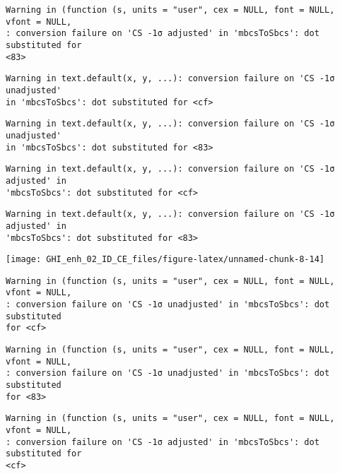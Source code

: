 \documentclass[
  10pt,
  a4paper,oneside]{article}
\begin{document}
\begin{verbatim}
Warning in (function (s, units = "user", cex = NULL, font = NULL, vfont = NULL,
: conversion failure on 'CS -1σ adjusted' in 'mbcsToSbcs': dot substituted for
<83>
\end{verbatim}

\begin{verbatim}
Warning in text.default(x, y, ...): conversion failure on 'CS -1σ unadjusted'
in 'mbcsToSbcs': dot substituted for <cf>
\end{verbatim}

\begin{verbatim}
Warning in text.default(x, y, ...): conversion failure on 'CS -1σ unadjusted'
in 'mbcsToSbcs': dot substituted for <83>
\end{verbatim}

\begin{verbatim}
Warning in text.default(x, y, ...): conversion failure on 'CS -1σ adjusted' in
'mbcsToSbcs': dot substituted for <cf>
\end{verbatim}

\begin{verbatim}
Warning in text.default(x, y, ...): conversion failure on 'CS -1σ adjusted' in
'mbcsToSbcs': dot substituted for <83>
\end{verbatim}

\begin{center}\texttt{[image: GHI\_enh\_02\_ID\_CE\_files/figure-latex/unnamed-chunk-8-14]} \end{center}

\begin{verbatim}
Warning in (function (s, units = "user", cex = NULL, font = NULL, vfont = NULL,
: conversion failure on 'CS -1σ unadjusted' in 'mbcsToSbcs': dot substituted
for <cf>
\end{verbatim}

\begin{verbatim}
Warning in (function (s, units = "user", cex = NULL, font = NULL, vfont = NULL,
: conversion failure on 'CS -1σ unadjusted' in 'mbcsToSbcs': dot substituted
for <83>
\end{verbatim}

\begin{verbatim}
Warning in (function (s, units = "user", cex = NULL, font = NULL, vfont = NULL,
: conversion failure on 'CS -1σ adjusted' in 'mbcsToSbcs': dot substituted for
<cf>
\end{verbatim}
\end{document}
